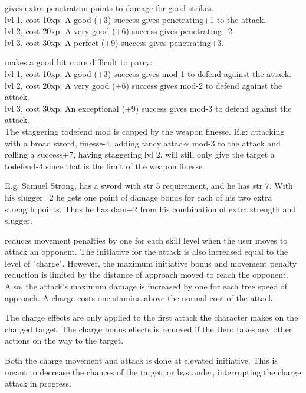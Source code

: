  gives extra penetration points to damage for good strikes. \\
lvl 1, cost 10xp: A good (+3) success gives penetrating+1 to the attack. \\
lvl 2, cost 20xp: A very good (+6) success gives penetrating+2. \\
lvl 3, cost 30xp: A perfect (+9) success gives penetrating+3.


 makes a good hit more difficult to parry: \\
lvl 1, cost 10xp: A good (+3) success gives mod-1 to defend against the attack.  \\
lvl 2, cost 20xp: A very good (+6) success gives mod-2 to defend against the attack.  \\
lvl 3, cost 30xp: An exceptional (+9) success gives mod-3 to defend against the attack.  \\

The staggering todefend mod is capped by the weapon finesse. E.g: attacking with a broad sword, finesse-4, adding fancy attacks mod-3 to the attack and rolling a success+7, having staggering lvl 2, will still only give the target a todefend-4 since that is the limit of the weapon finesse.

E.g: Samuel Strong, has a sword with str 5 requirement, and he has str 7. With his slugger=2 he gets one point of damage bonus for each of his two extra strength points. Thus he has dam+2 from his combination of extra strength and slugger.


 reduces movement penalties by one for each skill level when the user moves to attack an opponent. The initiative for the attack is also increased equal to the level of "charge". However, the maximum initiative bonus and movement penalty reduction is limited by the distance of approach moved to reach the opponent. Also, the attack's maximum damage is increased by one for each tree speed of approach. A charge costs one stamina above the normal cost of the attack.

The charge effects are only applied to the first attack the character makes on the charged target. The charge bonus effects is removed if the Hero takes any other actions on the way to the target.

Both the charge movement and attack is done at elevated initiative. This is meant to decrease the chances of the target, or bystander, interrupting the charge attack in progress.


